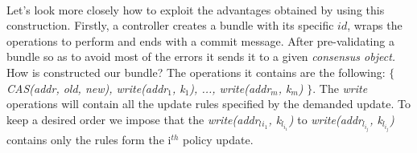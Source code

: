 \documentclass{article}
\begin{document}
\\
Let's look more closely how to exploit the advantages obtained by using this construction.
Firstly, a controller creates a bundle with its specific $id$, wraps the operations to perform and ends with a commit message. After pre-validating a bundle so as to avoid most of the errors it sends it to a given \emph{consensus object.} How is constructed our bundle? The operations it contains are the following: $\lbrace$ \emph{CAS(addr, old, new), write(addr$_1$, k$_1$), ..., write(addr$_m$, k$_m$)} $\rbrace$. The \emph{write} operations will contain all the update rules specified by the demanded update. To keep a desired order we impose that the 
\emph{write(addr$_l{_{i_1}}$, k$_{l_{i_1}}$)} to 
\emph{write(addr$_{l_{i_j}}$, k$_{l_{i_j}}$)} contains only the rules form the i$^{th}$ policy update.
  
\end{document}
